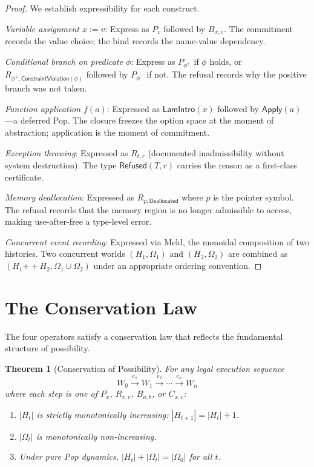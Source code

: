 \documentclass[12pt, a4paper, openany]{book}
\theoremstyle{plain}
\newtheorem{theorem}{Theorem}[chapter]
\theoremstyle{definition}
\theoremstyle{remark}
\newcommand{\Rfsd}{\mathsf{Refused}}
\begin{document}
\begin{proof}
We establish expressibility for each construct.

\textit{Variable assignment $x := v$}: Express as $P_v$ followed by $B_{x,v}$.
The commitment records the value choice; the bind records the name-value
dependency.

\textit{Conditional branch on predicate $\phi$}: Express as $P_{\phi^+}$ if $\phi$
holds, or $R_{\phi^+,\mathsf{ConstraintViolation}(\phi)}$ followed by
$P_{\phi^-}$ if not. The refusal records why the positive branch was not taken.

\textit{Function application $f(a)$}: Expressed as $\mathsf{LamIntro}(x)$ followed
by $\mathsf{Apply}(a)$---a deferred Pop. The closure freezes the option space at
the moment of abstraction; application is the moment of commitment.

\textit{Exception throwing}: Expressed as $R_{t, r}$ (documented inadmissibility
without system destruction). The type $\Rfsd(T, r)$ carries the reason as a
first-class certificate.

\textit{Memory deallocation}: Expressed as $R_{p, \mathsf{Deallocated}}$ where
$p$ is the pointer symbol. The refusal records that the memory region is no longer
admissible to access, making use-after-free a type-level error.

\textit{Concurrent event recording}: Expressed via Meld, the monoidal composition
of two histories. Two concurrent worlds $(H_1, \Omega_1)$ and $(H_2, \Omega_2)$
are combined as $(H_1 \mathbin{++} H_2, \Omega_1 \cup \Omega_2)$ under an
appropriate ordering convention.
\end{proof}

\section{The Conservation Law}

The four operators satisfy a conservation law that reflects the fundamental
structure of possibility.

\begin{theorem}[Conservation of Possibility]
\label{thm:conservation}
For any legal execution sequence
\[
W_0 \xrightarrow{e_1} W_1 \xrightarrow{e_2} \cdots \xrightarrow{e_n} W_n
\]
where each step is one of $P_x$, $R_{x,r}$, $B_{a,b}$, or $C_{x,c}$:
\begin{enumerate}
\item $|H_t|$ is strictly monotonically increasing: $|H_{t+1}| = |H_t| + 1$.
\item $|\Omega_t|$ is monotonically non-increasing.
\item Under pure Pop dynamics, $|H_t| + |\Omega_t| = |\Omega_0|$ for all $t$.
\end{enumerate}
\end{theorem}
\end{document}
